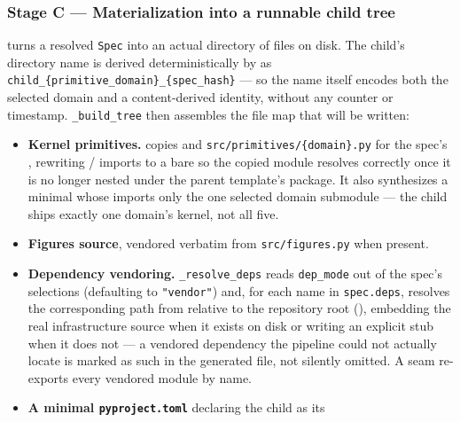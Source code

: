 \documentclass[
]{article}
\providecommand{\tightlist}{%
  \setlength{\itemsep}{0pt}\setlength{\parskip}{0pt}}
\begin{document}
\subsubsection{Stage C --- Materialization into a runnable child
tree}\label{stage-c-materialization-into-a-runnable-child-tree}

turns a resolved \texttt{Spec} into an actual directory of files on
disk. The child's directory name is derived deterministically by
 as
\texttt{child\_\{primitive\_domain\}\_\{spec\_hash\}} --- so the name
itself encodes both the selected domain and a content-derived identity,
without any counter or timestamp. \texttt{\_build\_tree} then assembles
the file map that will be written:

\begin{itemize}
\tightlist
\item
  \textbf{Kernel primitives.}  copies
   and
  \texttt{src/primitives/\{domain\}.py} for the spec's
  , rewriting  /
   imports to a bare 
  so the copied module resolves correctly once it is no longer nested
  under the parent template's package. It also synthesizes a minimal
   whose
   imports only the one selected domain
  submodule --- the child ships exactly one domain's kernel, not all
  five.
\item
  \textbf{Figures source}, vendored verbatim from
  \texttt{src/figures.py} when present.
\item
  \textbf{Dependency vendoring.} \texttt{\_resolve\_deps} reads
  \texttt{dep\_mode} out of the spec's selections (defaulting to
  \texttt{"vendor"}) and, for each name in \texttt{spec.deps}, resolves
  the corresponding path from 
  relative to the repository root
  (), embedding the real
  infrastructure source when it exists on disk or writing an explicit
   stub when it does not
  --- a vendored dependency the pipeline could not actually locate is
  marked as such in the generated file, not silently omitted. A seam
   re-exports every vendored module by
  name.
\item
  \textbf{A minimal \texttt{pyproject.toml}} declaring the child as its

\end{itemize}
\end{document}
